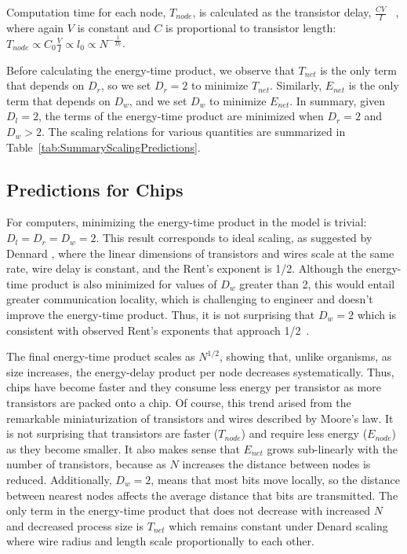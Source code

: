 \documentclass[12pt]{article}
\begin{document}
Computation time for each node, $T_{node}$, is calculated as the transistor
delay, $\frac{CV}{I}$ ~\cite{bakoglu90}, where again $V$ is constant and $C$ is
proportional to transistor length: $T_{node} \propto C_0 \frac{V}{I}  \propto
l_0  \propto N^{-\frac{1}{D_l}}$. 

Before calculating the energy-time product, we observe that $T_{net}$ is the
only term that depends on $D_r$, so we set  $D_r = 2$ to minimize
$T_{net}$. Similarly, $E_{net}$ is the only term that depends on  $D_w$, and we
set $D_w$ to minimize $E_{net}$.  In summary, given $D_l = 2$, the terms of the energy-time product are minimized
when $D_r = 2$ and $D_w > 2$. The scaling relations for various
quantities are summarized in Table~\ref{tab:SummaryScalingPredictions}.

\subsection{Predictions for Chips}
\label{sec:comp-predictions}


For computers, minimizing the energy-time product in the model is trivial: $D_l=D_r=D_w =
2$. This result corresponds to ideal scaling, as suggested by Dennard
\cite{dennard74}, where the linear dimensions of transistors and wires scale at
the same rate, wire delay is constant, and the Rent's exponent is 1/2.  Although
the energy-time product is also minimized for values of $D_w$ greater than 2,
this would entail greater communication locality, which is challenging
to engineer and doesn't improve
the energy-time product.  Thus, it is not surprising
that $D_w = 2$ which is consistent with observed
Rent's exponents that approach 1/2~\cite{yang2001wirelength, solee2013evolutionary}. 


The final energy-time product scales as $N^{1/2}$, showing that, unlike
organisms, as size increases, the energy-delay product per node decreases
systematically.  Thus, chips have become faster and they consume less energy per
transistor as more transistors are packed onto a chip. Of course, this
trend arised
from the remarkable miniaturization of transistors and wires described by
Moore's law. It is not surprising that transistors are faster ($T_{node}$) and
require less energy ($E_{node}$) as they become smaller. It also makes sense
that  $E_{net}$ grows sub-linearly with the number of transistors, because as
$N$ increases the distance between nodes is reduced. Additionally, $D_w = 2$,
means that most bits move locally, so the distance between nearest nodes
affects the average distance that bits are transmitted.  The only term in the
energy-time product that does not decrease with increased $N$ and decreased
process size is $T_{net}$ which remains constant under Denard scaling where
wire radius and length scale proportionally to each other.
\end{document}
